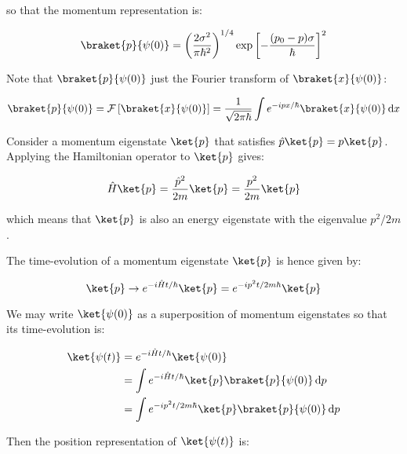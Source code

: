 \documentclass[12pt]{article}
\begin{document}
so that the momentum representation is:

\begin{equation}
    \braket{p}{\psi(0)} = \left( \frac{2\sigma^{2}}{\pi \hbar^{2}} \right)^{1/4} \exp \left[ -\frac{(p_{0} - p)\sigma}{\hbar} \right]^{2}
\end{equation}

Note that $\braket{p}{\psi(0)}$ just the Fourier transform of $\braket{x}{\psi(0)}$:

\begin{equation}
    \braket{p}{\psi(0)} = \mathcal{F} \left[ \braket{x}{\psi(0)} \right] = \frac{1}{\sqrt{2\pi\hbar}} \int e^{-ipx/\hbar} \braket{x}{\psi(0)} \, \mathrm{d}x
\end{equation}

Consider a momentum eigenstate $\ket{p}$ that satisfies $\hat{p} \ket{p} = p \ket{p}$. Applying the Hamiltonian operator to $\ket{p}$ gives:

\begin{equation}
    \hat{H} \ket{p} = \frac{\hat{p}^{2}}{2m} \ket{p} = \frac{p^{2}}{2m} \ket{p}
\end{equation}

which means that $\ket{p}$ is also an energy eigenstate with the eigenvalue $p^{2}/2m$.

The time-evolution of a momentum eigenstate $\ket{p}$ is hence given by:

\begin{equation}
    \ket{p} \to e^{-i\hat{H}t/\hbar} \ket{p} = e^{-ip^{2}t/2m\hbar} \ket{p}
\end{equation}

We may write $\ket{\psi(0)}$ as a superposition of momentum eigenstates so that its time-evolution is:

\begin{equation}
    \begin{split}
        \ket{\psi(t)} &= e^{-i\hat{H}t/\hbar} \ket{\psi(0)} \\
        &= \int e^{-i\hat{H}t/\hbar} \ket{p} \braket{p}{\psi(0)} \, \mathrm{d}p \\
        &= \int e^{-ip^{2}t/2m\hbar} \ket{p} \braket{p}{\psi(0)} \, \mathrm{d}p
    \end{split}
\end{equation}

Then the position representation of $\ket{\psi(t)}$ is:
\end{document}
